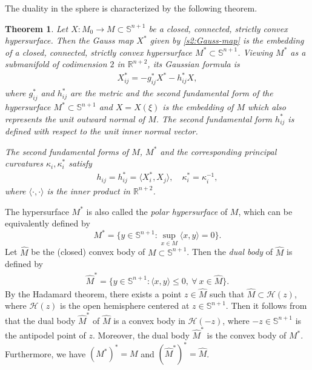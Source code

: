 \documentclass[11pt,reqno]{amsart}
\newtheorem{thm}{Theorem}[section]
\theoremstyle{definition}
\theoremstyle{remark}
\numberwithin{equation}{section}
\renewcommand{\(}{\left(}
\renewcommand{\)}{\right)}
\renewcommand{\~}{\tilde}
\renewcommand{\-}{\overline}
\renewcommand{\k}{\kappa}
\newcommand{\ra}{\rightarrow}
\begin{document}
The duality in the sphere is characterized by the following theorem. 
\begin{thm}\label{s2:thm-duality-sphere}\cite[Theorem 9.2.5, 9.2.9]{Gerh06}
	Let $X:M_0\ra M \subset \mathbb S^{n+1}$ be a closed, connected, strictly convex hypersurface. Then the Gauss map $X^\ast$ given by \eqref{s2:Gauss-map} is the embedding of a closed, connected, strictly convex hypersurface $M^\ast\subset \mathbb S^{n+1}$. Viewing $M^\ast$ as a submanifold of codimension $2$ in $\mathbb R^{n+2}$, its Gaussian formula is
	\begin{align}\label{s2:Gauss-formula-polar}
	X^\ast_{ij}=-g^{\ast}_{ij} X^\ast-h^{\ast}_{ij}X,
	\end{align}  
	where $g^\ast_{ij}$ and $h^\ast_{ij}$ are the metric and the second fundamental form of the hypersurface $M^\ast \subset \mathbb S^{n+1}$ and $X=X(\xi)$ is the embedding of $M$ which also represents the unit outward normal of $M$. The second fundamental form $h^\ast_{ij}$ is defined with respect to the unit inner normal vector.

	The second fundamental forms of $M$, $M^\ast$ and the corresponding principal curvatures $\k_i,\k_i^\ast$ satisfy 
	\begin{align}\label{s2:duality-sphere}
	h_{ij}=h^\ast_{ij}=\langle X^\ast_i,X_j\rangle, \quad \k_i^\ast=\k_i^{-1},
	\end{align}
	where $\langle \cdot,\cdot\rangle$ is the inner product in $\mathbb R^{n+2}$.
\end{thm}
The hypersurface $M^\ast$ is also called the {\em polar hypersurface} of $M$, which can be equivalently defined by
$$
M^\ast=\{y\in \mathbb S^{n+1} : \sup_{x\in M}\langle x,y\rangle=0\}.
$$ 
Let $\hat{M}$ be the (closed) convex body of $M\subset \mathbb S^{n+1}$. Then the {\em dual body} of $\hat{M}$ is defined by
\begin{align}\label{s2:dual-body-sphere}
\hat{M}^\ast=\{y\in \mathbb S^{n+1} : \langle x,y\rangle\leq 0, ~\forall ~x\in \hat{M}\}.
\end{align}
By the Hadamard theorem, there exists a point $z\in \hat{M}$ such that $\hat{M}\subset \mathcal H(z)$, where $\mathcal H(z)$ is the open hemisphere centered at $z\in \mathbb S^{n+1}$. Then it follows from \cite[Corollary 9.2.10]{Gerh06} that the dual body $\hat{M}^\ast$ of $\hat{M}$ is a convex body in $\mathcal H(-z)$, where $-z\in \mathbb S^{n+1}$ is the antipodel point of $z$. Moreover, the dual body $\hat{M}^\ast$ is the convex body of $M^\ast$. Furthermore, we have $(M^\ast)^\ast=M$ and $(\hat{M}^\ast)^\ast=\hat{M}$.
\end{document}
